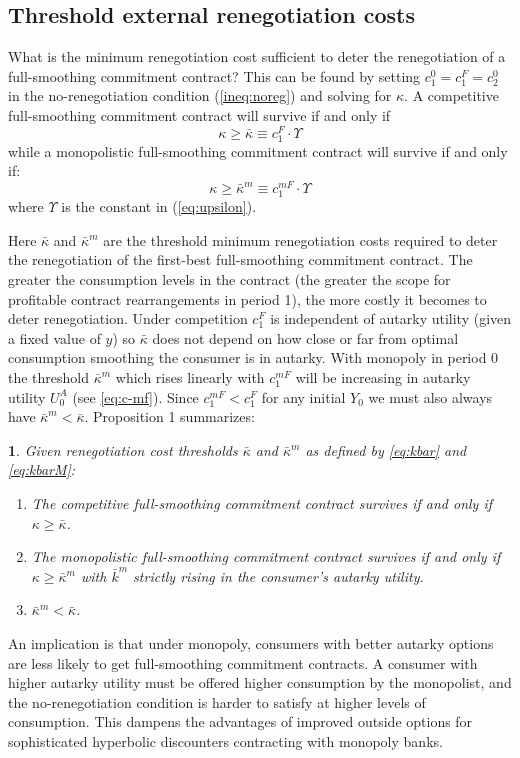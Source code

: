 \documentclass[11pt,english]{article}
\theoremstyle{plain}
\newtheorem{prop}{\protect\propositionname}
\theoremstyle{definition}
\providecommand{\propositionname}{Proposition}
\begin{document}
\subsection{Threshold external renegotiation costs }

What is the minimum renegotiation cost sufficient to deter the renegotiation
of a full-smoothing commitment contract? This can be found by setting $c_{1}^{0}=c_{1}^{F}=c_{2}^{0}$
in the no-renegotiation condition (\ref{ineq:noreg}) and solving
for $\kappa$. A competitive full-smoothing commitment contract will
survive if and only if 
\begin{equation}
\kappa\geq\bar{\kappa}\equiv c_{1}^{F}\cdot\Upsilon\label{eq:kbar}
\end{equation}
while a monopolistic full-smoothing commitment contract will survive
if and only if: 
\begin{equation}
\kappa\geq\bar{\kappa}^{m}\equiv c_{1}^{mF}\cdot\Upsilon\label{eq:kbarM}
\end{equation}
where $\Upsilon$ is the constant in (\ref{eq:upsilon}).

Here $\bar{\kappa}$ and $\bar{\kappa}^{m}$ are the threshold minimum
renegotiation costs required to deter the renegotiation of the first-best
full-smoothing commitment contract. The greater the consumption
levels in the contract (the greater the scope for profitable
contract rearrangements in period 1), the more costly it becomes to
deter renegotiation.
Under competition $c_{1}^{F}$ is independent of autarky utility (given
a fixed value of $y$) so $\bar{\kappa}$ does not depend on how close
or far from optimal consumption smoothing the consumer is in autarky.
With monopoly in period 0 the threshold $\bar{\kappa}^{m}$ which
rises linearly with $c_{1}^{mF}$ will be increasing in autarky utility
$U_{0}^{A}$ (see \ref{eq:c-mf}). Since $c_{1}^{mF}<c_{1}^{F}$ for
any initial $Y_{0}$ we must also always have $\bar{\kappa}^{m}<\bar{\kappa}$.
Proposition 1 summarizes: 
\begin{prop}
\label{Prop:full-commit} Given renegotiation cost thresholds  $\bar{\kappa}$
and $\bar{\kappa}^{m}$ as defined by \ref{eq:kbar} and
\ref{eq:kbarM}: 
\begin{enumerate} [label=\alph*)]
\item The competitive full-smoothing commitment contract survives
if and only if $\kappa\geq$$\bar{\kappa}$. 
\item The monopolistic full-smoothing commitment contract survives
if and only if $\kappa\geq$$\bar{\kappa}^{m}$ with $\bar{k}^{m}$
strictly rising in the consumer's autarky utility. 
\item $\bar{\kappa}^{m}<\bar{\kappa}$. 
\end{enumerate}
\end{prop}
An implication is that under
monopoly, consumers with better autarky options are less likely to
get full-smoothing commitment contracts. A
consumer with higher autarky utility must be offered higher consumption
by the monopolist, and the no-renegotiation condition is harder to
satisfy at higher levels of consumption. This  dampens the
advantages of improved outside options for sophisticated hyperbolic
discounters contracting with monopoly banks.
\end{document}

